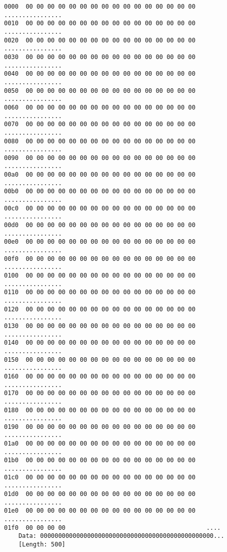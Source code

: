 \begin{lstlisting}
0000  00 00 00 00 00 00 00 00 00 00 00 00 00 00 00 00   ................
0010  00 00 00 00 00 00 00 00 00 00 00 00 00 00 00 00   ................
0020  00 00 00 00 00 00 00 00 00 00 00 00 00 00 00 00   ................
0030  00 00 00 00 00 00 00 00 00 00 00 00 00 00 00 00   ................
0040  00 00 00 00 00 00 00 00 00 00 00 00 00 00 00 00   ................
0050  00 00 00 00 00 00 00 00 00 00 00 00 00 00 00 00   ................
0060  00 00 00 00 00 00 00 00 00 00 00 00 00 00 00 00   ................
0070  00 00 00 00 00 00 00 00 00 00 00 00 00 00 00 00   ................
0080  00 00 00 00 00 00 00 00 00 00 00 00 00 00 00 00   ................
0090  00 00 00 00 00 00 00 00 00 00 00 00 00 00 00 00   ................
00a0  00 00 00 00 00 00 00 00 00 00 00 00 00 00 00 00   ................
00b0  00 00 00 00 00 00 00 00 00 00 00 00 00 00 00 00   ................
00c0  00 00 00 00 00 00 00 00 00 00 00 00 00 00 00 00   ................
00d0  00 00 00 00 00 00 00 00 00 00 00 00 00 00 00 00   ................
00e0  00 00 00 00 00 00 00 00 00 00 00 00 00 00 00 00   ................
00f0  00 00 00 00 00 00 00 00 00 00 00 00 00 00 00 00   ................
0100  00 00 00 00 00 00 00 00 00 00 00 00 00 00 00 00   ................
0110  00 00 00 00 00 00 00 00 00 00 00 00 00 00 00 00   ................
0120  00 00 00 00 00 00 00 00 00 00 00 00 00 00 00 00   ................
0130  00 00 00 00 00 00 00 00 00 00 00 00 00 00 00 00   ................
0140  00 00 00 00 00 00 00 00 00 00 00 00 00 00 00 00   ................
0150  00 00 00 00 00 00 00 00 00 00 00 00 00 00 00 00   ................
0160  00 00 00 00 00 00 00 00 00 00 00 00 00 00 00 00   ................
0170  00 00 00 00 00 00 00 00 00 00 00 00 00 00 00 00   ................
0180  00 00 00 00 00 00 00 00 00 00 00 00 00 00 00 00   ................
0190  00 00 00 00 00 00 00 00 00 00 00 00 00 00 00 00   ................
01a0  00 00 00 00 00 00 00 00 00 00 00 00 00 00 00 00   ................
01b0  00 00 00 00 00 00 00 00 00 00 00 00 00 00 00 00   ................
01c0  00 00 00 00 00 00 00 00 00 00 00 00 00 00 00 00   ................
01d0  00 00 00 00 00 00 00 00 00 00 00 00 00 00 00 00   ................
01e0  00 00 00 00 00 00 00 00 00 00 00 00 00 00 00 00   ................
01f0  00 00 00 00                                       ....
    Data: 000000000000000000000000000000000000000000000000...
    [Length: 500]
\end{lstlisting}
